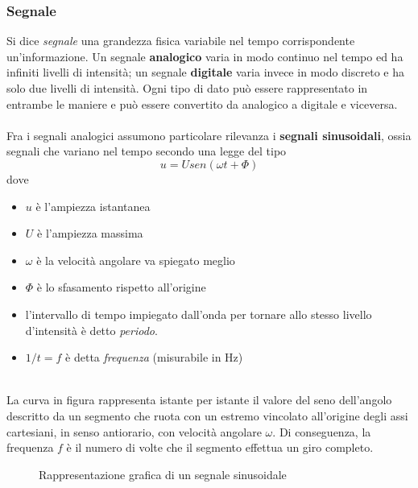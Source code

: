 \documentclass[a4paper,11pt]{article}
\def\subsub#1{\subsubsection{#1}\label{#1}}
\begin{document}
\subsub{Segnale}
Si dice \textit{segnale} una grandezza fisica variabile nel tempo corrispondente un'informazione. Un segnale \textbf{analogico} varia in modo continuo nel tempo ed ha infiniti livelli di intensità; un segnale \textbf{digitale} varia invece in modo discreto e ha solo due livelli di intensità. Ogni tipo di dato può essere rappresentato in entrambe le maniere e può essere convertito da analogico a digitale e viceversa.
\\\\Fra i segnali analogici assumono particolare rilevanza i \textbf{segnali sinusoidali}, ossia segnali che variano nel tempo secondo una legge del tipo \[u=Usen(\omega t+\Phi )\] dove 
\begin{itemize}
\item $u$ è l'ampiezza istantanea
\item $U$ è l'ampiezza massima
\item $\omega $ è la velocità angolare 
va spiegato meglio
\item $\Phi $ è lo sfasamento rispetto all'origine
\item l'intervallo di tempo impiegato dall'onda per tornare allo stesso livello d'intensità è detto \textit{periodo}.
\item $1/t=f$ è detta \textit{frequenza} (misurabile in Hz)\\\\
\end{itemize}
La curva in figura rappresenta istante per istante il valore del seno dell'angolo descritto da un segmento che ruota con un estremo vincolato all'origine degli assi cartesiani, in senso antiorario, con velocità angolare $\omega $. Di conseguenza, la frequenza $f$ è il numero di volte che il segmento effettua un giro completo.
\begin{figure}
\centering
{}
\caption{Rappresentazione grafica di un segnale sinusoidale}\label{fig. 1}
\end{figure}
\end{document}
